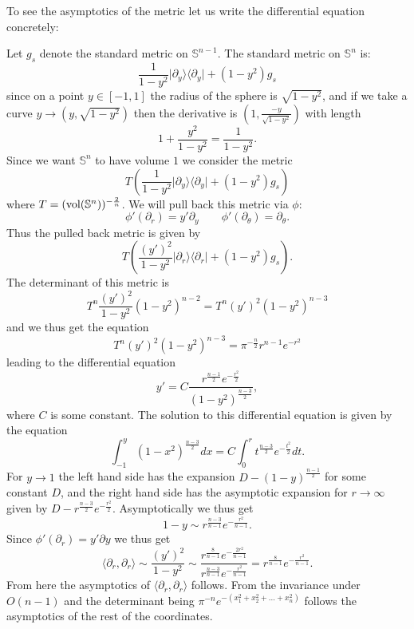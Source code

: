 \documentclass[letterpaper,12pt]{article}
\newcommand{\pa}{\partial}
\begin{document}
To see the asymptotics of the metric let us write the differential equation concretely: 


Let $g_{s}$ denote the standard metric on $\mathbb{S}^{n-1}$. 
The standard metric on $\mathbb{S}^{n}$ is:
$$
\frac{1}{1-y^2} \vert \pa_y \rangle \langle \pa_y \vert + (1-y^2) g_{s}
$$
since on a point $y\in [-1,1]$ the radius of the sphere is $\sqrt{1-y^2}$, and if we take a curve $y\rightarrow (y,\sqrt{1-y^2})$ then the derivative is $(1,\frac{-y}{\sqrt{1-y^2}})$ with length
$$
1+ \frac{y^2}{1-y^2} = \frac{1}{1-y^2}.
$$
Since we want $\mathbb{S}^{n}$ to have volume $1$ we consider the metric
$$
T\left(\frac{1}{1-y^2} \vert \pa_y \rangle \langle \pa_y \vert + (1-y^2) g_{s}\right)
$$
where $T=(\hbox{vol}(\mathbb{S}^{n}))^{-\frac{2}{n}}$.
We will pull back this metric via $\phi$:
$$
\phi'(\pa_r) = y' \pa_y\qquad \phi'(\pa_\theta) = \pa_\theta.
$$
Thus the pulled back metric is given by
$$
T\left( \frac{(y')^2}{1-y^2} \vert \pa_r \rangle \langle \pa_r \vert + (1-y^2) g_{s} \right).
$$
The determinant of this metric is
$$
T^n\frac{(y')^2}{1-y^2} (1-y^2)^{n-2} =T^n (y')^2(1-y^2)^{n-3}
$$
and we thus get the equation
\begin{equation}
T^n(y')^2(1-y^2)^{n-3} =\pi^{-\frac{n}{2}} r^{n-1}e^{-r^2}
\label{zzzz}
\end{equation}
leading to the differential equation
$$
y' = C \frac{r^{\frac{n-1}{2}} e^{-\frac{r^2}{2}}}{(1-y^2)^{\frac{n-3}{2}}},
$$
where $C$ is some constant. The solution to this differential equation is given by the equation
$$
\int_{-1}^y (1-x^2)^{\frac{n-3}{2}} dx =  C\int_0^r t^{\frac{n-3}{2}} e^{-\frac{t^2}{2}} dt.
$$
For $y \to 1$ the left hand side has the expansion $D-(1-y)^{\frac{n-1}{2}}$ for some constant $D$, and the right hand side has the asymptotic expansion 
for $r\to \infty$ given by $D-r^{\frac{n-3}{2}} e^{-\frac{r^2}{2}}$. Asymptotically we thus get 
$$1-y \sim  r^{\frac{n-3}{n-1}} e^{-\frac{r^2}{n-1}}.$$
Since $\phi' (\partial_r)=y'\partial y$ we thus get 
$$\langle \partial_r ,\partial_r \rangle \sim  \frac{(y')^2}{1-y^2} \sim \frac{r^{\frac{8}{n-1}}e^{-\frac{2r^2}{n-1}}}{r^{\frac{n-3}{n-1}} e^{-\frac{r^2}{n-1}}} =r^{\frac{8}{n-1}}e^{-\frac{r^2}{n-1}} .$$
From here the asymptotics of $\langle \partial_r ,\partial_r \rangle$ follows. From the invariance under $O(n-1)$ and the determinant being $\pi^{-n}e^{-(x_1^2+x_2^2+\ldots +x_n^2)}$ follows the asymptotics of the rest of the coordinates.
\end{document}
